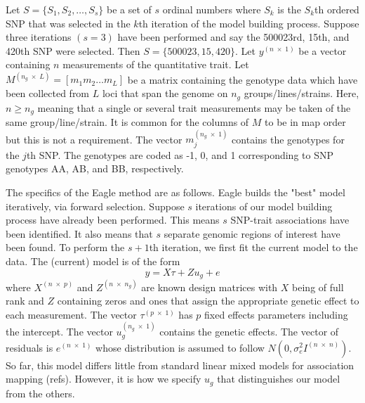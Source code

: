 \documentclass{article}
\begin{document}
Let $S = \{ S_1, S_2, \ldots, S_s\}$ be a set of $s$ ordinal numbers where $S_k$ is the $S_k$th ordered SNP that was 
selected in the $k$th iteration of the model building process. Suppose three iterations  $(s=3)$
have been performed and say the 500023rd, 15th, and 420th
SNP were selected. Then $S=\{500023, 15, 420\}$. 
Let $y^{(n \; \times \;1)}$ be a vector containing $n$ measurements of the quantitative trait. 
Let $M^{(n_g \; \times \; L)} = [m_1 m_2 \ldots m_L]$ be a matrix containing the genotype data which have been collected 
from $L$ loci that span the genome on $n_g$ groups/lines/strains.  Here, $n \geq n_g$ meaning that a single or several trait measurements 
may be taken of the same group/line/strain. 
 It is common for the columns of $M$ to be in map order but this is not a requirement. 
The vector $m_j^{(n_g \; \times \; 1)}$ contains the genotypes for the $j$th SNP. 
The genotypes are coded as -1, 0, and 1 corresponding to SNP genotypes AA, AB, and BB, respectively. 

The specifics of the Eagle method are as follows. 
Eagle builds the "best" model iteratively, via forward selection. 
Suppose $s$ iterations of our model building process have already been performed. This means $s$ SNP-trait 
associations have been identified.  It also means that $s$ separate genomic regions of interest have been found.  
To perform the $s+1$th  iteration, we first fit the current model to the data. 
The (current) model is of the form 
\begin{equation}
\label{eq1}
y = X \tau + Z u_g + e
\end{equation}
where 
$X^{(n \; \times \; p)}$ and $Z^{( n \; \times \; n_g)}$ are known design matrices with $X$ being of full rank and $Z$ 
containing zeros and ones that assign the appropriate genetic effect to each measurement. 
The vector 
$\tau^{(p \; \times \; 1)}$ has $p$ fixed effects parameters including the intercept. The vector 
$u_g^{(n_g \; \times \; 1)}$ contains the 
genetic effects. The vector of residuals is 
$e^{(n \; \times \;1)}$ whose distribution is assumed to follow $N(0, \sigma^2_e I^{(n \; \times \; n)})$. 
So far,  this model differs little from standard linear mixed models for association mapping (refs). 
However, 
it is how we specify $u_g$ that distinguishes our model from the others. 
\end{document}

